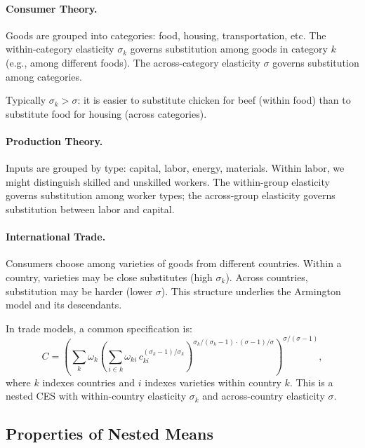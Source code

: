 \paragraph{Consumer Theory.}
Goods are grouped into categories: food, housing, transportation, etc. The within-category elasticity $\sigma_k$ governs substitution among goods in category $k$ (e.g., among different foods). The across-category elasticity $\sigma$ governs substitution among categories.

Typically $\sigma_k > \sigma$: it is easier to substitute chicken for beef (within food) than to substitute food for housing (across categories).

\paragraph{Production Theory.}
Inputs are grouped by type: capital, labor, energy, materials. Within labor, we might distinguish skilled and unskilled workers. The within-group elasticity governs substitution among worker types; the across-group elasticity governs substitution between labor and capital.

\paragraph{International Trade.}
Consumers choose among varieties of goods from different countries. Within a country, varieties may be close substitutes (high $\sigma_k$). Across countries, substitution may be harder (lower $\sigma$). This structure underlies the Armington model and its descendants.

\begin{calloutnote}
In trade models, a common specification is:
\begin{equation}
C = \left( \sum_k \omega_k \left( \sum_{i \in k} \omega_{ki} \, c_{ki}^{(\sigma_k - 1)/\sigma_k} \right)^{\sigma_k/(\sigma_k-1) \cdot (\sigma-1)/\sigma} \right)^{\sigma/(\sigma-1)},
\end{equation}
where $k$ indexes countries and $i$ indexes varieties within country $k$. This is a nested CES with within-country elasticity $\sigma_k$ and across-country elasticity $\sigma$.
\end{calloutnote}

\subsection{Properties of Nested Means}
\label{subsec:properties-nested}

